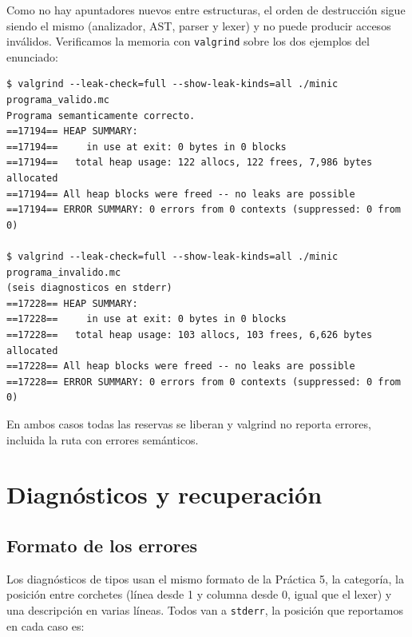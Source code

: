 \documentclass[12pt,letterpaper]{article}
\begin{document}
Como no hay apuntadores nuevos entre estructuras, el orden de destrucción sigue siendo el mismo (analizador,
AST, parser y lexer) y no puede producir accesos inválidos. Verificamos la memoria con \texttt{valgrind} sobre
los dos ejemplos del enunciado:

\begin{verbatim}
$ valgrind --leak-check=full --show-leak-kinds=all ./minic programa_valido.mc
Programa semanticamente correcto.
==17194== HEAP SUMMARY:
==17194==     in use at exit: 0 bytes in 0 blocks
==17194==   total heap usage: 122 allocs, 122 frees, 7,986 bytes allocated
==17194== All heap blocks were freed -- no leaks are possible
==17194== ERROR SUMMARY: 0 errors from 0 contexts (suppressed: 0 from 0)

$ valgrind --leak-check=full --show-leak-kinds=all ./minic programa_invalido.mc
(seis diagnosticos en stderr)
==17228== HEAP SUMMARY:
==17228==     in use at exit: 0 bytes in 0 blocks
==17228==   total heap usage: 103 allocs, 103 frees, 6,626 bytes allocated
==17228== All heap blocks were freed -- no leaks are possible
==17228== ERROR SUMMARY: 0 errors from 0 contexts (suppressed: 0 from 0)
\end{verbatim}

En ambos casos todas las reservas se liberan y valgrind no reporta errores, incluida la ruta con errores
semánticos.

\section*{Diagnósticos y recuperación}

\subsection*{Formato de los errores}

Los diagnósticos de tipos usan el mismo formato de la Práctica 5, la categoría, la posición entre corchetes
(línea desde 1 y columna desde 0, igual que el lexer) y una descripción en varias líneas. Todos van a
\texttt{stderr}, la posición que reportamos en cada caso es:
\end{document}
